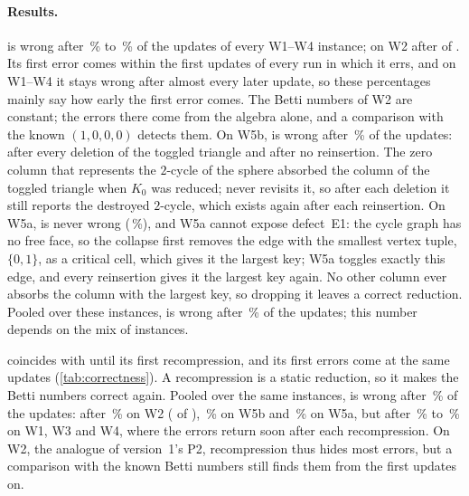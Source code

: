 \documentclass[10pt]{article}
\begin{document}
\paragraph{Results.}
 is wrong after \NumLcrWOneTorusOneHundredTwentyEightErrPct\,\% to
\NumLcrWTwoNFifteenSEightErrPct\,\% of the updates of every W1--W4 instance; on
W2 after \NumLcrWTwoNFifteenSEightWrong{} of \NumLcrWTwoNFifteenSEightUpdates.
Its first error comes within the first \NumLcrFirstWrongMaxAll{} updates of
every run in which it errs, and on W1--W4 it stays wrong after almost every
later update, so these percentages mainly say how early the first error comes.
The Betti numbers of W2 are constant; the errors there come from the algebra
alone, and a comparison with the known $(1,0,0,0)$ detects them. On W5b,
 is wrong after \NumLcrWFiveSphereLFiveErrPct\,\% of the updates:
after every deletion of the toggled triangle and after no reinsertion. The zero
column that represents the $2$-cycle of the sphere absorbed the column of the
toggled triangle when $K_0$ was reduced;  never revisits it, so after
each deletion it still reports the destroyed $2$-cycle, which exists again after
each reinsertion. On W5a,  is never wrong
(\NumLcrWFiveCycleLTenThousandErrPct\,\%), and W5a cannot expose defect~E1: the
cycle graph has no free face, so the collapse first removes the edge with the
smallest vertex tuple, $\{0,1\}$, as a critical cell, which gives it the largest
key; W5a toggles exactly this edge, and every reinsertion gives it the largest
key again. No other column ever absorbs the column with the largest key, so
dropping it leaves a correct reduction. Pooled over these instances,
 is wrong after \NumLcrErrAll\,\% of the updates; this number
depends on the mix of instances.

 coincides with  until its first recompression, and
its first errors come at the same updates (\cref{tab:correctness}). A
recompression is a static reduction, so it makes the Betti numbers correct
again. Pooled over the same instances,  is wrong after
\NumLcrRcErrAll\,\% of the updates: after
\NumLcrRcWTwoNFifteenSEightErrPct\,\% on W2
(\NumLcrRcWTwoNFifteenSEightWrong{} of \NumLcrRcWTwoNFifteenSEightUpdates),
\NumLcrRcWFiveSphereLFiveErrPct\,\% on W5b and
\NumLcrRcWFiveCycleLTenThousandErrPct\,\% on W5a, but after
\NumLcrRcWFourPlaneNFourThousandDTwoErrPct\,\% to \NumLcrRcErrMax\,\% on W1, W3
and W4, where the errors return soon after each recompression. On W2, the
analogue of version~1's P2, recompression thus hides most errors, but a
comparison with the known Betti numbers still finds them from the first updates
on.
\end{document}
